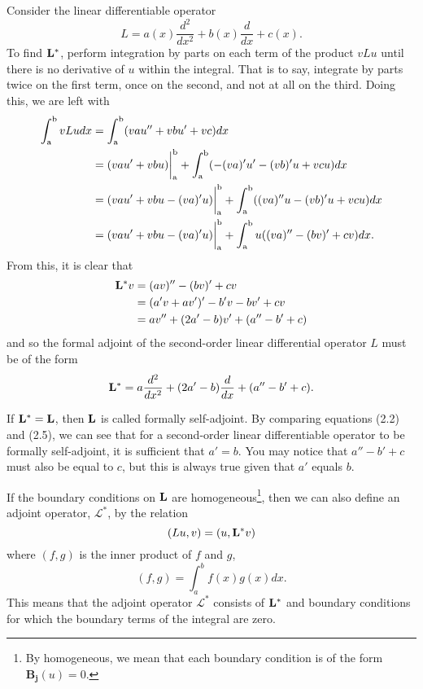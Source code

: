 \begin{example}
	Consider the linear differentiable operator
	\begin{equation}
		L= a(x) \frac{d^2}{dx^2} + b(x)\frac{d}{dx} + c(x).
	\end{equation}
	To find \(\mathrm{\bf{L^*}}  \), perform integration by parts on each term of the product \(vLu\) until there is no derivative of \(u\) within the integral. That is to say, integrate by parts twice on the first term, once on the second, and not at all on the third. Doing this, we are left with
	\begin{equation}
		\begin{split}
			\int_\mathrm{a}^\mathrm{b} vLu dx &= \int_\mathrm{a}^\mathrm{b} (vau''+ vbu' + vc)dx\\
			&=(vau'+vbu)\biggr\rvert_\mathrm{a}^\mathrm{b} + \int_\mathrm{a}^\mathrm{b} (-(va)'u'-(vb)'u+vcu)dx\\
			&=(vau'+vbu-(va)'u)\biggr\rvert_\mathrm{a}^\mathrm{b} + \int_\mathrm{a}^\mathrm{b} ((va)''u-(vb)'u+vcu)dx\\
			&=(vau'+vbu-(va)'u)\biggr\rvert_\mathrm{a}^\mathrm{b} + \int_\mathrm{a}^\mathrm{b} u((va)''-(bv)'+cv)dx.
		\end{split}
	\end{equation}
	From this, it is clear that 
	\begin{equation}
		\begin{split}
			\mathrm{\bf{L^*}} v &= (av)''-(bv)'+cv\\
			     &= (a'v+av')'-b'v-bv'+cv\\
			     &= av''+(2a'-b)v'+(a''-b'+c)
		\end{split}
	\end{equation}
	and so the formal adjoint of the second-order linear differential operator \(L\) must be of the form
	\begin{equation}
		\mathrm{\bf{L^*}} =a\frac{d^2}{dx^2} + (2a'-b)\frac{d}{dx}+(a''-b'+c).
	\end{equation}
	
	
	If \(\mathrm{\bf{L^*}}  = \mathrm{\bf{L}}\), then \( \mathrm{\bf{L}}\) is called formally self-adjoint. By comparing equations (2.2) and (2.5), we can see that for a second-order linear differentiable operator to be formally self-adjoint, it is sufficient that \(a'=b\). You may notice that \(a''-b'+c\) must also be equal to \(c\), but this is always true given that \(a'\) equals \(b\).
\end{example}

\begin{definition}
	If the boundary conditions on \(\mathrm{\bf{L}}\) are homogeneous\footnote{By homogeneous, we mean that each boundary condition is of the form \(\mathbf{B_j} (u)=0\).}, then we can also define an adjoint operator, \(\mathcal{L}^*\), by the relation
	\begin{equation}
		(Lu,v) = (u,\mathrm{\bf{L^*}} v)
	\end{equation}
	where \((f,g)\) is the inner product of \(f\) and \(g\),
	\begin{equation}
		(f,g) = \int_a^bf(x)g(x)dx.
	\end{equation}
	This means that the adjoint operator \(\mathcal{L}^*\) consists of \(\mathrm{\bf{L^*}} \) and boundary conditions for which the boundary terms of the integral are zero. 
\end{definition}


